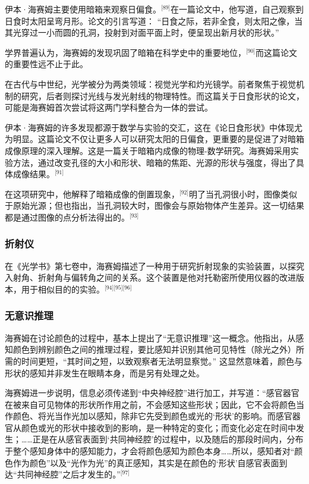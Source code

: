 伊本·海赛姆主要使用暗箱来观察日偏食。\(^\text{[89]}\)在一篇论文中，他写道，自己观察到日食时太阳呈弯月形。论文的引言写道： “日食之际，若非全食，则太阳之像，当其光穿过一小而圆的孔洞，投射到对面平面上时，便呈现出新月状的形状。”

学界普遍认为，海赛姆的发现巩固了暗箱在科学史中的重要地位，\(^\text{[90]}\)而这篇论文的重要性远不止于此。

在古代与中世纪，光学被分为两类领域：视觉光学和灼光镜学。前者聚焦于视觉机制的研究，后者则探讨光线与发光射线的物理特性。而这篇关于日食形状的论文，可能是海赛姆首次尝试将这两门学科整合为一体的尝试。

伊本·海赛姆的许多发现都源于数学与实验的交汇，这在《论日食形状》中体现尤为明显。这篇论文不仅让更多人可以研究太阳的日偏食，更重要的是促进了对暗箱成像原理的深入理解。这是一篇关于暗箱内成像的物理-数学研究。海赛姆采用实验方法，通过改变孔径的大小和形状、暗箱的焦距、光源的形状与强度，得出了具体成像结果。\(^\text{[91]}\)

在这项研究中，他解释了暗箱成像的倒置现象，\(^\text{[92]}\)明了当孔洞很小时，图像类似于原始光源；但也指出，当孔洞较大时，图像会与原始物体产生差异。这一切结果都是通过图像的点分析法得出的。\(^\text{[93]}\)
\subsubsection{折射仪}
在《光学书》第七卷中，海赛姆描述了一种用于研究折射现象的实验装置，以探究入射角、折射角与偏转角之间的关系。这个装置是他对托勒密所使用仪器的改进版本，用于相似目的的实验。\(^\text{[94][95][96]}\)
\subsubsection{无意识推理}
海赛姆在讨论颜色的过程中，基本上提出了“无意识推理”这一概念。他指出，从感知颜色到辨别颜色之间的推理过程，要比感知并识别其他可见特性（除光之外）所需的时间更短，“其时间之短，以致观察者无法明显察觉。” 这显然意味着，颜色与形状的感知并非发生在眼睛本身，而是另有处理之处。

海赛姆进一步说明，信息必须传递到“中央神经腔”进行加工，并写道：“感官器官在被来自可见物体的形状所作用之前，不会感知这些形状；因此，它不会将颜色当作颜色、将光当作光加以感知，除非它先受到颜色或光的‘形状’的影响。而感官器官从颜色或光的形状中接收到的影响，是一种特定的变化；而变化必定在时间中发生；……正是在从感官表面到‘共同神经腔’的过程中，以及随后的那段时间内，分布于整个感知身体中的感知能力，才会将颜色感知为颜色本身……所以，感知者对“颜色作为颜色”以及“光作为光”的真正感知，其实是在颜色的‘形状’自感官表面到达“共同神经腔”之后才发生的。”\(^\text{[97]}\)
